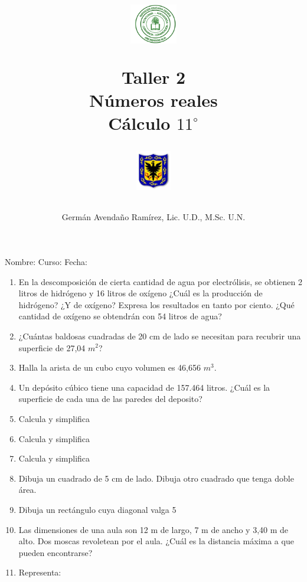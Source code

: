 \documentclass[10pt,twoside]{article}
\author{Germ\'an Avenda\~no Ram\'irez, Lic. U.D., M.Sc. U.N.}
\title{\begin{minipage}{.2\textwidth}
\includegraphics[height=1.75cm]{Images/logo-colegio.png}\end{minipage}
\begin{minipage}{.55\textwidth}
\begin{center}
Taller 2\\
Números reales\\
Cálculo $11^{\circ}$
\end{center}
\end{minipage}\hfill
\begin{minipage}{.2\textwidth}
\includegraphics[height=1.75cm]{Images/logo-sed.png} 
\end{minipage}}
\date{}
\begin{document}
\maketitle
Nombre: \hrulefill Curso: \underline{\hspace*{44pt}} Fecha: \underline{\hspace*{2.5cm}}\\

\begin{enumerate}
  \item En la descomposición de cierta cantidad de agua por electrólisis, se obtienen 2 litros de hidrógeno y 16 litros de oxígeno ¿Cuál es la producción de hidrógeno? ¿Y de oxígeno? Expresa los resultados en tanto por ciento. ¿Qué cantidad de oxígeno se obtendrán con 54 litros de agua?
  \item ¿Cuántas baldosas cuadradas de 20 cm de lado se necesitan para recubrir una superficie de 27,04 $ m^2 $?
  \item Halla la arista de un cubo cuyo volumen es 46,656 $m^3$.
  \item Un depósito cúbico tiene una capacidad de 157.464 litros. ¿Cuál es la superficie de cada una de las paredes del deposito?
\item Calcula y simplifica
\begin{enumerate}
\end{enumerate}
\item Calcula y simplifica
\begin{enumerate}
\end{enumerate}
\item Calcula y simplifica
\begin{enumerate}
\end{enumerate}
\item Dibuja un cuadrado de 5 cm de lado. Dibuja otro cuadrado que tenga doble área.
\item Dibuja un rectángulo cuya diagonal valga 5
\item Las dimensiones de una aula son 12 m de largo, 7 m de ancho y 3,40 m de alto. Dos moscas revoletean por el aula. ¿Cuál es la distancia máxima a que pueden encontrarse?
\item Representa:\\


\end{enumerate}
\end{document}
